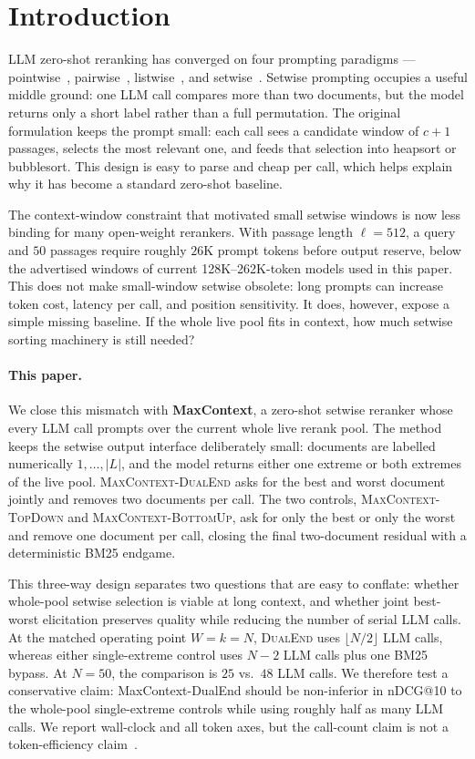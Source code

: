 \section{Introduction}
\label{sec:introduction}

LLM zero-shot reranking has converged on four prompting paradigms —
pointwise~\citep{nogueira2020monot5}, pairwise~\citep{qin2024prp},
listwise~\citep{sun2023rankgpt}, and setwise~\citep{zhuang2024setwise}.
Setwise prompting occupies a useful middle ground: one LLM call compares
more than two documents, but the model returns only a short label rather
than a full permutation. The original formulation keeps the prompt small:
each call sees a candidate window of $c{+}1$ passages, selects the most
relevant one, and feeds that selection into heapsort or bubblesort. This
design is easy to parse and cheap per call, which helps explain why it has
become a standard zero-shot baseline.

The context-window constraint that motivated small setwise windows is now
less binding for many open-weight rerankers. With passage length
$\ell=512$, a query and $50$ passages require roughly $26$K prompt tokens
before output reserve, below the advertised windows of current
128K--262K-token models used in this paper. This does not make
small-window setwise obsolete: long prompts can increase token cost,
latency per call, and position sensitivity. It does, however, expose a
simple missing baseline. If the whole live pool fits in context, how much
setwise sorting machinery is still needed?

\paragraph{This paper.} We close this mismatch with \textbf{MaxContext},
a zero-shot setwise reranker whose every LLM call prompts over the
current whole live rerank pool. The method keeps the setwise output
interface deliberately small: documents are labelled numerically
$1,\ldots,|L|$, and the model returns either one extreme or both extremes
of the live pool. \textsc{MaxContext-DualEnd} asks for the best and worst
document jointly and removes two documents per call. The two controls,
\textsc{MaxContext-TopDown} and \textsc{MaxContext-BottomUp}, ask for
only the best or only the worst and remove one document per call, closing
the final two-document residual with a deterministic BM25 endgame.

This three-way design separates two questions that are easy to conflate:
whether whole-pool setwise selection is viable at long context, and
whether joint best-worst elicitation preserves quality while reducing the
number of serial LLM calls. At the matched operating point $W=k=N$,
\textsc{DualEnd} uses $\lfloor N/2 \rfloor$ LLM calls, whereas either
single-extreme control uses $N{-}2$ LLM calls plus one BM25 bypass. At
$N{=}50$, the comparison is $25$ vs.\ $48$ LLM calls. We therefore test a
conservative claim: MaxContext-DualEnd should be non-inferior in nDCG@10
to the whole-pool single-extreme controls while using roughly half as many
LLM calls. We report wall-clock and all token axes, but the call-count
claim is not a token-efficiency claim~\citep{peng2025flopsreranking}.

